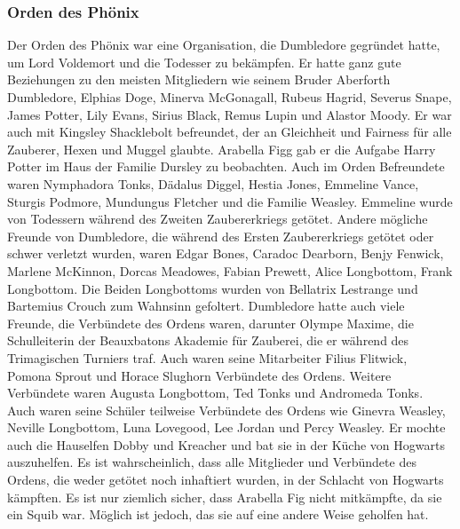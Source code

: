 \documentclass[a4paper, 10pt]{article}
\begin{document}
\subsubsection*{\large Orden des Phönix}
Der Orden des Phönix war eine Organisation, die Dumbledore gegründet hatte, um Lord Voldemort und die Todesser zu bekämpfen. Er hatte ganz gute Beziehungen zu den meisten Mitgliedern wie seinem Bruder Aberforth Dumbledore, Elphias Doge, Minerva McGonagall, Rubeus Hagrid, Severus Snape, James Potter, Lily Evans, Sirius Black, Remus Lupin und Alastor Moody.
\vspace{10pt}
\newline
{}  
Er war auch mit Kingsley Shacklebolt befreundet, der an Gleichheit und Fairness für alle Zauberer, Hexen und Muggel glaubte. Arabella Figg gab er die Aufgabe Harry Potter im Haus der Familie Dursley zu beobachten. Auch im Orden Befreundete waren Nymphadora Tonks, Dädalus Diggel, Hestia Jones, Emmeline Vance, Sturgis Podmore, Mundungus Fletcher und die Familie Weasley. Emmeline wurde von Todessern während des Zweiten Zaubererkriegs getötet.
\vspace{10pt}
\newline
{}  
Andere mögliche Freunde von Dumbledore, die während des Ersten Zaubererkriegs getötet oder schwer verletzt wurden, waren Edgar Bones, Caradoc Dearborn, Benjy Fenwick, Marlene McKinnon, Dorcas Meadowes, Fabian Prewett, Alice Longbottom, Frank Longbottom. Die Beiden Longbottoms wurden von Bellatrix Lestrange und Bartemius Crouch zum Wahnsinn gefoltert.
\vspace{10pt}
\newline
{}  
Dumbledore hatte auch viele Freunde, die Verbündete des Ordens waren, darunter Olympe Maxime, die Schulleiterin der Beauxbatons Akademie für Zauberei, die er während des Trimagischen Turniers traf. Auch waren seine Mitarbeiter Filius Flitwick, Pomona Sprout und Horace Slughorn Verbündete des Ordens. Weitere Verbündete waren Augusta Longbottom, Ted Tonks und Andromeda Tonks. Auch waren seine Schüler teilweise Verbündete des Ordens wie Ginevra Weasley, Neville Longbottom, Luna Lovegood, Lee Jordan und Percy Weasley. Er mochte auch die Hauselfen Dobby und Kreacher und bat sie in der Küche von Hogwarts auszuhelfen.
\vspace{10pt}
\newline
{}  
Es ist wahrscheinlich, dass alle Mitglieder und Verbündete des Ordens, die weder getötet noch inhaftiert wurden, in der Schlacht von Hogwarts kämpften. Es ist nur ziemlich sicher, dass Arabella Fig nicht mitkämpfte, da sie ein Squib war. Möglich ist jedoch, das sie auf eine andere Weise geholfen hat.
\end{document}
